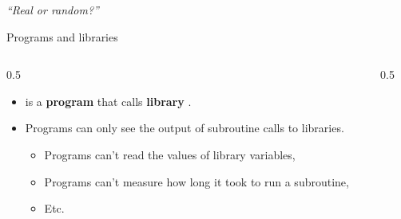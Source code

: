 \ifdefined\PRESENTATION\else\PassOptionsToClass{handout}{beamer}\fi\documentclass[aspectratio=169, lualatex]{beamer}
\begin{document}
\begin{frame}
	\begin{center}
		\huge \textit{``Real or random?''}
	\end{center}
\end{frame}

\begin{frame}{Programs and libraries}
	\begin{columns}[c]
		\begin{column}{0.5\textwidth}
			\begin{itemize}
				\item \prog{} is a \textbf{program} that calls \textbf{library} .
				\item Programs can only see the output of subroutine calls to libraries.
				      \begin{itemize}
					      \item Programs can't read the values of library variables,
					      \item Programs can't measure how long it took to run a subroutine,
					      \item Etc.
				      \end{itemize}
			\end{itemize}
		\end{column}
		\begin{column}{0.5\textwidth}
		\end{column}
	\end{columns}
\end{frame}
\end{document}
